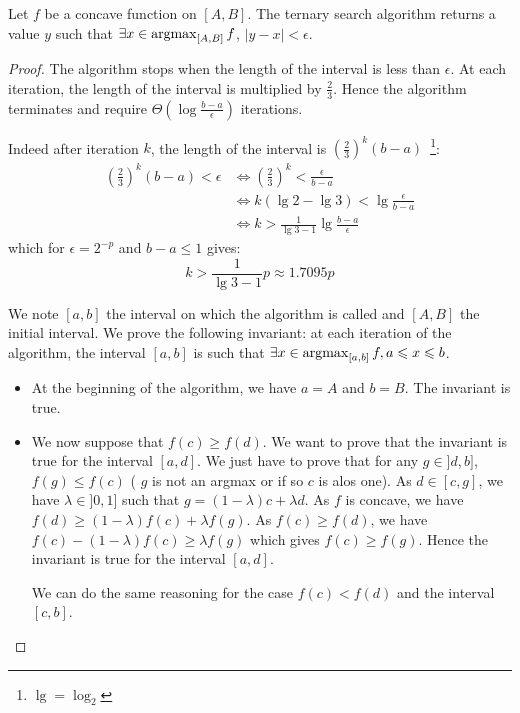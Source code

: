 \begin{thm}
    Let $f$ be a concave function on $[A, B]$. The ternary search algorithm returns a value $y$ such that $\exists x \in \operatorname*{argmax}_{[A, B]} f$, $|y - x| < \epsilon$.
\end{thm}
\begin{proof}
    The algorithm stops when the length of the interval is less than $\epsilon$. At each iteration, the length of the interval is multiplied by $\frac{2}{3}$. Hence the algorithm terminates and require $\Theta(\log \frac{b - a}{\epsilon})$ iterations.

    Indeed after iteration $k$, the length of the interval is $\left(\frac{2}{3}\right)^k(b - a)$~\footnote{$\lg=\log_2$}:
    \begin{align}
        \left(\frac{2}{3}\right)^k(b - a) < \epsilon &\Leftrightarrow \left(\frac{2}{3}\right)^k < \frac{\epsilon}{b - a} \\
        &\Leftrightarrow k (\lg 2 - \lg 3) < \lg \frac{\epsilon}{b - a} \\
        &\Leftrightarrow k > \frac{1}{\lg 3 - 1} \lg \frac{b - a}{\epsilon}
        \end{align}
    which for $\epsilon = 2^{-p}$ and $b - a \leq 1$ gives:
    \begin{equation}
        k > \frac{1}{\lg 3 - 1} p \approx 1.7095 p
    \end{equation}

    We note $[a, b]$ the interval on which the algorithm is called and $[A, B]$ the initial interval.
    We prove the following invariant: at each iteration of the algorithm, the interval $[a, b]$ is such that $\exists x \in \operatorname*{argmax}_{[a, b]} f, a \leqslant x \leqslant b$.
    \begin{itemize}
        \item At the beginning of the algorithm, we have $a = A$ and $b = B$. The invariant is true.
        \item We now suppose that $f(c) \geq f(d)$. We want to prove that the invariant is true for the interval $[a, d]$. We just have to prove that for any $g \in ]d, b]$, $f(g) \leq f(c)$ ( $g$ is not an argmax or if so $c$ is alos one). As $d \in [c, g]$, we have $\lambda \in ]0, 1]$ such that $g = (1 - \lambda)c + \lambda d$. As $f$ is concave, we have $f(d) \geq (1 - \lambda)f(c) + \lambda f(g)$. As $f(c) \geq f(d)$, we have $f(c) - (1 - \lambda)f(c) \geq \lambda f(g)$ which gives $f(c) \geq f(g)$. Hence the invariant is true for the interval $[a, d]$.
        
        We can do the same reasoning for the case $f(c) < f(d)$ and the interval $[c, b]$.
    \end{itemize}
\end{proof}


